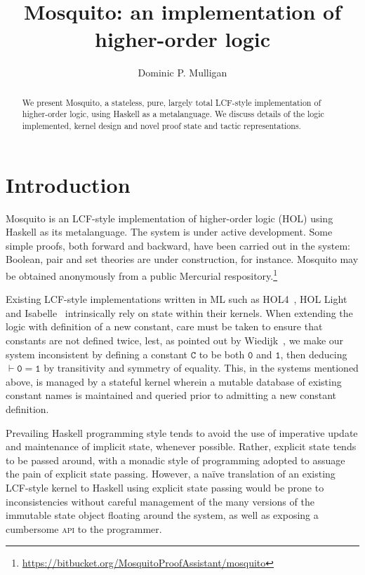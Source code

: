 \documentclass{llncs}
\author{Dominic P. Mulligan}
\title{Mosquito: an implementation of higher-order logic}
\institute{Computer Laboratory, University of Cambridge}
\newcommand{\mosquito}{Mosquito\xspace}
\begin{document}
\maketitle

\begin{abstract}
We present \mosquito, a stateless, pure, largely total LCF-style implementation of higher-order logic, using Haskell as a metalanguage.
We discuss details of the logic implemented, kernel design and novel proof state and tactic representations.
\end{abstract}

\section{Introduction}
\mosquito is an LCF-style implementation of higher-order logic (HOL) using Haskell as its metalanguage.
The system is under active development.
Some simple proofs, both forward and backward, have been carried out in the system: Boolean, pair and set theories are under construction, for instance.
\mosquito may be obtained anonymously from a public Mercurial respository.\footnote{\url{https://bitbucket.org/MosquitoProofAssistant/mosquito}}

Existing LCF-style implementations written in ML such as HOL4~\cite{gordon:introduction:1993}, HOL Light~\cite{harrison:hol:2009} and Isabelle~\cite{wenzel:isabelle:2008} intrinsically rely on state within their kernels.
When extending the logic with definition of a new constant, care must be taken to ensure that constants are not defined twice, lest, as pointed out by Wiedijk~\cite{wiedijk:stateless:2011}, we make our system inconsistent by defining a constant $\mathtt{C}$ to be both $\mathtt{0}$ and $\mathtt{1}$, then deducing $\vdash \mathtt{0 = 1}$ by transitivity and symmetry of equality.
This, in the systems mentioned above, is managed by a stateful kernel wherein a mutable database of existing constant names is maintained and queried prior to admitting a new constant definition.

Prevailing Haskell programming style tends to avoid the use of imperative update and maintenance of implicit state, whenever possible.
Rather, explicit state tends to be passed around, with a monadic style of programming adopted to assuage the pain of explicit state passing.
However, a na\"ive translation of an existing LCF-style kernel to Haskell using explicit state passing would be prone to inconsistencies without careful management of the many versions of the immutable state object floating around the system, as well as exposing a cumbersome \textsc{api} to the programmer.
\end{document}

